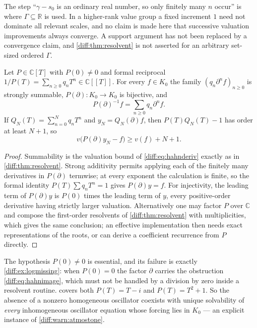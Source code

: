 \documentclass[11pt,letterpaper]{article}
\numberwithin{equation}{section}
\theoremstyle{definition}
\theoremstyle{remark}
\newcommand{\R}{\mathbb R}
\newcommand{\C}{\mathbb C}
\newcommand{\der}{\partial}
\begin{document}
\begin{warning}
\label{diff:warn:resolventreal}
The step ``$\gamma-s_{0}$ is an ordinary real number, so only finitely many
$n$ occur'' is where $\Gamma\subseteq\R$ is used. In a higher-rank value group
a fixed increment $1$ need not dominate all relevant scales, and no claim is
made here that successive valuation improvements always converge. A support
argument has not been replaced by a convergence claim, and
\cref{diff:thm:resolvent} is not asserted for an arbitrary set-sized ordered
$\Gamma$.
\end{warning}

\begin{proposition}
\label{diff:prop:polyresolvent}
Let $P\in\C[T]$ with $P(0)\neq0$ and formal reciprocal
$1/P(T)=\sum_{n\geq0}q_{n}T^{n}\in\C[[T]]$. For every $f\in K_{0}$ the family
$(q_{n}\der^{n}f)_{n\geq0}$ is strongly summable, $P(\der):K_{0}\to K_{0}$ is
bijective, and
\begin{equation}\label{diff:eq:polyresolvent}
 P(\der)^{-1}f=\sum_{n\geq0}q_{n}\der^{n}f .
\end{equation}
If $Q_{N}(T)=\sum_{n=0}^{N}q_{n}T^{n}$ and $y_{N}=Q_{N}(\der)f$, then
$P(T)Q_{N}(T)-1$ has order at least $N+1$, so
\begin{equation}\label{diff:eq:polyresidual}
 v\bigl(P(\der)y_{N}-f\bigr)\geq v(f)+N+1 .
\end{equation}
\end{proposition}
\begin{proof}
Summability is the valuation bound of \cref{diff:eq:hahnderiv} exactly as in
\cref{diff:thm:resolvent}. Strong additivity permits applying each of the
finitely many derivatives in $P(\der)$ termwise; at every exponent the
calculation is finite, so the formal identity $P(T)\sum q_{n}T^{n}=1$ gives
$P(\der)y=f$. For injectivity, the leading term of $P(\der)y$ is $P(0)$ times
the leading term of $y$, every positive-order derivative having strictly
larger valuation. Alternatively one may factor $P$ over $\C$ and compose the
first-order resolvents of \cref{diff:thm:resolvent} with multiplicities, which
gives the same conclusion; an effective implementation then needs exact
representations of the roots, or can derive a coefficient recurrence from $P$
directly.
\end{proof}

The hypothesis $P(0)\neq0$ is essential, and its failure is exactly
\cref{diff:ex:logmissing}: when $P(0)=0$ the factor $\der$ carries the
obstruction \cref{diff:eq:hahnimage}, which must not be handled by a division
by zero inside a resolvent routine.  covers both
$P(T)=T-i$ and $P(T)=T^{2}+1$. So the absence of a nonzero homogeneous
oscillator coexists with unique solvability of \emph{every} inhomogeneous
oscillator equation whose forcing lies in $K_{0}$ --- an explicit instance of
\cref{diff:warn:atmostone}.
\end{document}

